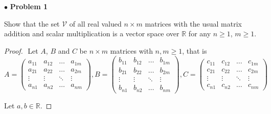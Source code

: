 \documentclass{article}
\begin{document}
$ \bullet$ \textbf{Problem 1}
\medskip

\begin{itshape}
Show that the set $\mathcal{V}$ of all real valued $n \times m$ matrices with the usual matrix addition and scalar multiplication is a vector space over $\mathbb{R}$ for any $n \ge 1$, $m \ge1$.
\end{itshape}
\medskip

\begin{proof}
$ $\newline
Let $A$, $B$ and $C$ be $n \times m$ matrices with $n,m \ge 1$, that is 
$$A = \begin{pmatrix} a_{11} & a_{12} & \ldots & a_{1m} \\ a_{21} & a_{22} & \ldots  & a_{2m} \\ \vdots & \vdots & \ddots & \vdots \\ a_{n1} & a_{n2} & \ldots & a_{nm} \end{pmatrix}, B = \begin{pmatrix} b_{11} & b_{12} & \ldots & b_{1m} \\ b_{21} & b_{22} & \ldots  & b_{2m} \\ \vdots & \vdots & \ddots & \vdots \\ b_{n1} & b_{n2} & \ldots & b_{nm} \end{pmatrix}, C= \begin{pmatrix} c_{11} & c_{12} & \ldots & c_{1m} \\ c_{21} & c_{22} & \ldots  & c_{2m} \\ \vdots & \vdots & \ddots & \vdots \\ c_{n1} & c_{n2} & \ldots & c_{nm} \end{pmatrix}$$

Let $a, b \in \mathbb{R}$.
\smallskip


\end{proof}
\end{document}
